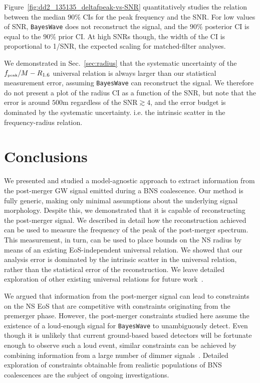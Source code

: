 \documentclass[aps,prd,amsmath,floats,floatfix, twocolumn,
superscriptaddress,nofootinbib,showpacs]{revtex4-1}
\newcommand{\peak}{{\mbox{\tiny peak}}}
\begin{document}
Figure~\ref{fig:dd2_135135_deltafpeak-vs-SNR} quantitatively studies the relation between the median $90\%$ CIs for the peak frequency and the SNR. For low values of SNR, {\tt BayesWave}  does not reconstruct the signal, and the $90\%$ posterior CI is equal to the $90\%$ prior CI. At high SNRs though, the width of the CI is proportional to 1/SNR, the expected scaling for matched-filter analyses.

We demonstrated in Sec.~\ref{sec:radius} that the systematic uncertainty of the $f_{\peak}/M-R_{1.6}$ universal relation is always larger than our statistical measurement error, assuming {\tt BayesWave} can reconstruct the signal. We therefore do not present a plot of the radius CI as a function of the SNR, but note that the error is around $500$m regardless of the SNR$\gtrsim 4$, and the error budget is dominated by the systematic uncertainty. i.e. the intrinsic scatter in the frequency-radius relation. 

\section{Conclusions}

We presented and studied a model-agnostic approach to extract information from the post-merger GW signal emitted during a BNS coalescence. Our method is fully generic, making only minimal assumptions about the underlying signal morphology. Despite this, we demonstrated that it is capable of reconstructing the post-merger signal. We described in detail how the reconstruction achieved can be used to measure the frequency of the peak of the post-merger spectrum. This measurement, in turn, can be used to place bounds on the NS radius by means of an existing EoS-independent universal relation. We showed that our analysis error is dominated by the intrinsic scatter in the universal relation, rather than the statistical error of the reconstruction. We leave detailed exploration of other existing universal relations for future work~\cite{2015arXiv150401764B,Lehner:2016lxy}.

We argued that information from the post-merger signal can lead to constraints on the NS EoS that are competitive with constraints originating from the premerger phase. However, the post-merger constraints studied here assume the existence of a loud-enough signal for {\tt BayesWave} to unambiguously detect. Even though it is unlikely that current ground-based based detectors will be fortunate enough to observe such a loud event, similar constraints can be achieved by combining information from a large number of dimmer signals~\cite{PhysRevLett.111.071101,Bose:2017jvk,Yang:2017xlf}. Detailed exploration of constraints obtainable from realistic populations of BNS coalescences are the subject of ongoing investigations. 
\end{document}
